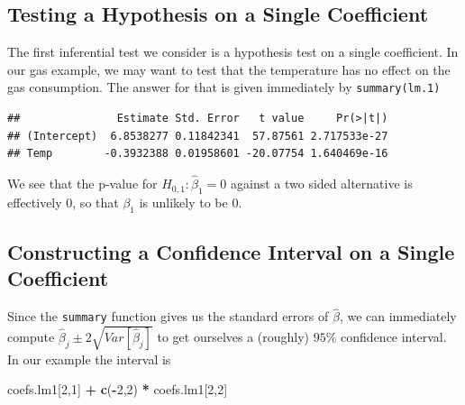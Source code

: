 \documentclass[]{book}
\newenvironment{Shaded}{\begin{snugshade}}{\end{snugshade}}
\newcommand{\KeywordTok}[1]{\textcolor[rgb]{0.13,0.29,0.53}{\textbf{#1}}}
\newcommand{\DecValTok}[1]{\textcolor[rgb]{0.00,0.00,0.81}{#1}}
\newcommand{\StringTok}[1]{\textcolor[rgb]{0.31,0.60,0.02}{#1}}
\newcommand{\OperatorTok}[1]{\textcolor[rgb]{0.81,0.36,0.00}{\textbf{#1}}}
\newcommand{\NormalTok}[1]{#1}
\theoremstyle{definition}
\theoremstyle{definition}
\theoremstyle{definition}
\theoremstyle{remark}
\begin{document}
\subsection{Testing a Hypothesis on a Single
Coefficient}\label{testing-a-hypothesis-on-a-single-coefficient}

The first inferential test we consider is a hypothesis test on a single
coefficient. In our gas example, we may want to test that the
temperature has no effect on the gas consumption. The answer for that is
given immediately by \texttt{summary(lm.1)}

\begin{Shaded}
\end{Shaded}

\begin{verbatim}
##               Estimate Std. Error   t value     Pr(>|t|)
## (Intercept)  6.8538277 0.11842341  57.87561 2.717533e-27
## Temp        -0.3932388 0.01958601 -20.07754 1.640469e-16
\end{verbatim}

We see that the p-value for \(H_{0,1}:\hat \beta_1=0\) against a two
sided alternative is effectively 0, so that \(\beta_1\) is unlikely to
be \(0\).

\subsection{Constructing a Confidence Interval on a Single
Coefficient}\label{constructing-a-confidence-interval-on-a-single-coefficient}

Since the \texttt{summary} function gives us the standard errors of
\(\hat \beta\), we can immediately compute
\(\hat \beta_j \pm 2 \sqrt{Var[\hat \beta_j]}\) to get ourselves a
(roughly) \(95\%\) confidence interval. In our example the interval is

\begin{Shaded}
\begin{Highlighting}[]
\NormalTok{coefs.lm1[}\DecValTok{2}\NormalTok{,}\DecValTok{1}\NormalTok{] }\OperatorTok{+}\StringTok{ }\KeywordTok{c}\NormalTok{(}\OperatorTok{-}\DecValTok{2}\NormalTok{,}\DecValTok{2}\NormalTok{) }\OperatorTok{*}\StringTok{ }\NormalTok{coefs.lm1[}\DecValTok{2}\NormalTok{,}\DecValTok{2}\NormalTok{]}
\end{Highlighting}
\end{Shaded}
\end{document}
